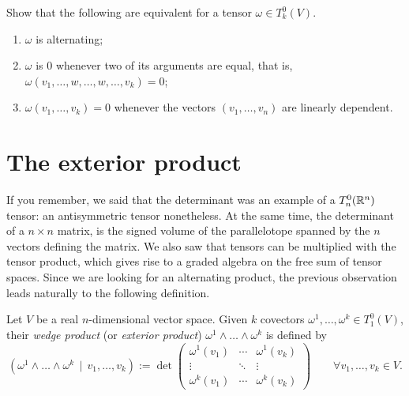 \begin{exercise}\label{ex:propAlt}
	Show that the following are equivalent for a tensor $\omega\in T_k^0(V)$.
	\begin{enumerate}
		\item $\omega$ is alternating;
		\item $\omega$ is $0$ whenever two of its arguments are equal, that is, ${\omega(v_1, \ldots, w, \ldots, w, \ldots, v_k) = 0}$;
		\item $\omega(v_1, \ldots, v_k) = 0$ whenever the vectors $(v_1, \ldots, v_n)$ are linearly dependent.
	\end{enumerate}
\end{exercise}

\section{The exterior product}

If you remember, we said that the determinant was an example of a $T_n^0(\mathbb{R}^n)$ tensor: an antisymmetric tensor nonetheless.
At the same time, the determinant of a $n\times n$ matrix, is the signed volume of the parallelotope spanned by the $n$ vectors defining the matrix.
We also saw that tensors can be multiplied with the tensor product, which gives rise to a graded algebra on the free sum of tensor spaces.
Since we are looking for an alternating product, the previous observation leads naturally to the following definition.

\begin{definition}
	Let $V$ be a real $n$-dimensional vector space.
	Given $k$ covectors $\omega^1, \ldots, \omega^k\in T_1^0(V)$, their \emph{wedge product} (or \emph{exterior product}) $\omega^1\wedge\ldots\wedge\omega^k$ is defined by
	\begin{equation}
		\left(
		\omega^1\wedge\ldots\wedge\omega^k\,\mid\, v_1,\ldots,v_k
		\right) := \det\begin{pmatrix}
			\omega^1(v_1) & \cdots & \omega^1(v_k) \\
			\vdots        & \ddots & \vdots        \\
			\omega^k(v_1) & \cdots & \omega^k(v_k)
		\end{pmatrix} \qquad
		\forall v_1,\ldots,v_k\in V.
	\end{equation}
\end{definition}

